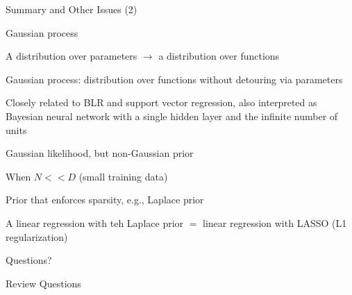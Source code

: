 \documentclass[handout,fleqn,aspectratio=169]{beamer}
\begin{document}
\begin{frame}{Summary and Other Issues (2)}

\plitemsep 0.07in

\bci 

\item Gaussian process
\bci
\item A distribution over parameters $\rightarrow$ a distribution over functions
\item Gaussian process: distribution over functions without detouring via parameters
\item Closely related to BLR and support vector regression, also interpreted as Bayesian neural network with a single hidden layer and the infinite number of units
\eci

\item Gaussian likelihood, but non-Gaussian prior
\bci
\item When $N << D$ (small training data)
\item Prior that enforces sparsity, e.g., Laplace prior 
\item A linear regression with teh Laplace prior $=$ linear regression with LASSO (L1 regularization)
\eci
\eci
\end{frame}


\begin{frame}{}
\vspace{2cm}
\LARGE Questions?


\end{frame}

\begin{frame}{Review Questions}
\bce[1)]
\item 

\ece
\end{frame}
\end{document}
